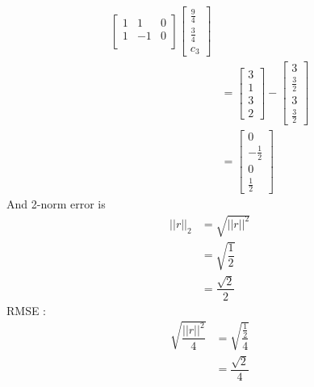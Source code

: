 \documentclass{article}
\begin{document}
\begin{enumerate}
\begin{align*}
\begin{bmatrix}
1&1&0\\
1&-1&0\\
\end{bmatrix}\begin{bmatrix}
\frac{9}{4}\\\frac{3}{4}\\c_3
\end{bmatrix}\\
&=\begin{bmatrix}
3\\1\\3\\2
\end{bmatrix}-\begin{bmatrix}
3\\\frac{3}{2}\\3\\\frac{3}{2}
\end{bmatrix}\\
&=\begin{bmatrix}
0\\-\frac{1}{2}\\0\\\frac{1}{2}
\end{bmatrix}
\end{align*}
And 2-norm error is \begin{align*}
||r||_2&=\sqrt{||r||^2}\\
&=\sqrt{\dfrac{1}{2}}\\&=\dfrac{\sqrt{2}}{2}
\end{align*}
RMSE :\begin{align*}
\sqrt{\dfrac{||r||^2}{4}}&=\sqrt{\dfrac{\frac{1}{2}}{4}}\\
&=\dfrac{\sqrt{2}}{4}
\end{align*}
\end{enumerate}
\end{document}
